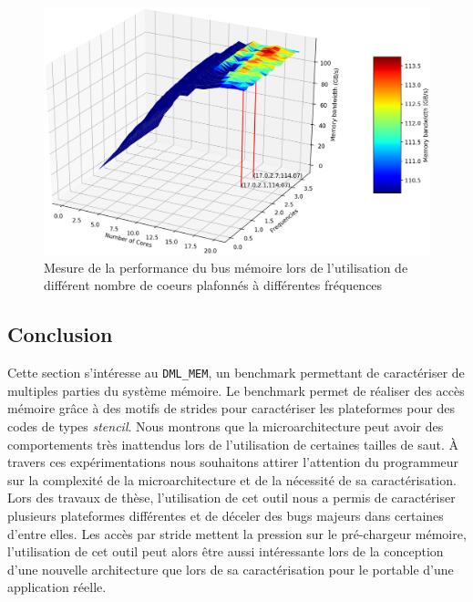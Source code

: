     \begin{figure}
    \center
    \includegraphics[width=14cm]{images/dml_core_vs_freq.png}
    \caption{\label{pic:dml_core_vs_freq} Mesure de la performance du bus mémoire lors de l'utilisation de différent nombre de coeurs plafonnés à différentes fréquences}
    \end{figure}
    


    
    

\subsection{Conclusion}

    Cette section s'intéresse au \verb=DML_MEM=, un benchmark permettant de caractériser de multiples parties du système mémoire. Le benchmark permet de réaliser des accès mémoire grâce à des motifs de strides pour caractériser les plateformes pour des codes de types \textit{stencil}.
    Nous montrons que la microarchitecture peut avoir des comportements très inattendus lors de l'utilisation de certaines tailles de saut. À travers ces expérimentations nous souhaitons attirer l'attention du programmeur sur la complexité de la microarchitecture et de la nécessité de sa caractérisation.
    Lors des travaux de thèse, l'utilisation de cet outil nous a permis de caractériser plusieurs plateformes différentes et de déceler des bugs majeurs dans certaines d'entre elles. Les accès par stride mettent la pression sur le pré-chargeur mémoire, l'utilisation de cet outil peut alors être aussi intéressante lors de la conception d'une nouvelle architecture que lors de sa caractérisation pour le portable d'une application réelle. 